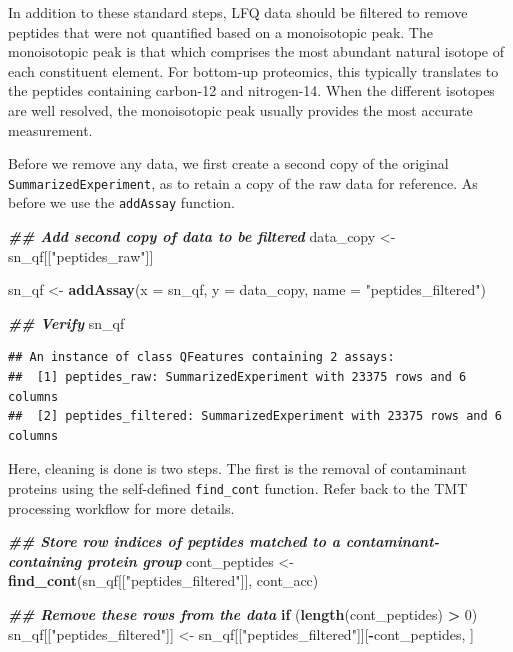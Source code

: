 \documentclass[9pt,a4paper,]{extarticle}
\newenvironment{Shaded}{\begin{snugshade}}{\end{snugshade}}
\newcommand{\AttributeTok}[1]{\textcolor[rgb]{0.13,0.29,0.53}{#1}}
\newcommand{\ControlFlowTok}[1]{\textcolor[rgb]{0.13,0.29,0.53}{\textbf{#1}}}
\newcommand{\DecValTok}[1]{\textcolor[rgb]{0.00,0.00,0.81}{#1}}
\newcommand{\DocumentationTok}[1]{\textcolor[rgb]{0.56,0.35,0.01}{\textbf{\textit{#1}}}}
\newcommand{\FunctionTok}[1]{\textcolor[rgb]{0.13,0.29,0.53}{\textbf{#1}}}
\newcommand{\NormalTok}[1]{#1}
\newcommand{\OtherTok}[1]{\textcolor[rgb]{0.56,0.35,0.01}{#1}}
\newcommand{\SpecialCharTok}[1]{\textcolor[rgb]{0.81,0.36,0.00}{\textbf{#1}}}
\newcommand{\StringTok}[1]{\textcolor[rgb]{0.31,0.60,0.02}{#1}}
\begin{document}
In addition to these standard steps, LFQ data should be filtered to remove
peptides that were not quantified based on a monoisotopic peak. The monoisotopic
peak is that which comprises the most abundant natural isotope of each
constituent element. For bottom-up proteomics, this typically translates to the
peptides containing carbon-12 and nitrogen-14. When the different isotopes are
well resolved, the monoisotopic peak usually provides the most accurate
measurement.

Before we remove any data, we first create a second copy of the original
\texttt{SummarizedExperiment}, as to retain a copy of the raw data for reference. As
before we use the \texttt{addAssay} function.

\begin{Shaded}
\begin{Highlighting}[]
\DocumentationTok{\#\# Add second copy of data to be filtered}
\NormalTok{data\_copy }\OtherTok{\textless{}{-}}\NormalTok{ sn\_qf[[}\StringTok{"peptides\_raw"}\NormalTok{]]}

\NormalTok{sn\_qf }\OtherTok{\textless{}{-}} \FunctionTok{addAssay}\NormalTok{(}\AttributeTok{x =}\NormalTok{ sn\_qf,}
                  \AttributeTok{y =}\NormalTok{ data\_copy, }
                  \AttributeTok{name =} \StringTok{"peptides\_filtered"}\NormalTok{)}

\DocumentationTok{\#\# Verify}
\NormalTok{sn\_qf}
\end{Highlighting}
\end{Shaded}

\begin{verbatim}
## An instance of class QFeatures containing 2 assays:
##  [1] peptides_raw: SummarizedExperiment with 23375 rows and 6 columns 
##  [2] peptides_filtered: SummarizedExperiment with 23375 rows and 6 columns
\end{verbatim}

Here, cleaning is done is two steps. The first is the removal of contaminant
proteins using the self-defined \texttt{find\_cont} function. Refer back to the TMT
processing workflow for more details.

\begin{Shaded}
\begin{Highlighting}[]
\DocumentationTok{\#\# Store row indices of peptides matched to a contaminant{-}containing protein group}
\NormalTok{cont\_peptides }\OtherTok{\textless{}{-}} \FunctionTok{find\_cont}\NormalTok{(sn\_qf[[}\StringTok{"peptides\_filtered"}\NormalTok{]], cont\_acc)}

\DocumentationTok{\#\# Remove these rows from the data}
\ControlFlowTok{if}\NormalTok{ (}\FunctionTok{length}\NormalTok{(cont\_peptides) }\SpecialCharTok{\textgreater{}} \DecValTok{0}\NormalTok{)}
\NormalTok{  sn\_qf[[}\StringTok{"peptides\_filtered"}\NormalTok{]] }\OtherTok{\textless{}{-}}\NormalTok{ sn\_qf[[}\StringTok{"peptides\_filtered"}\NormalTok{]][}\SpecialCharTok{{-}}\NormalTok{cont\_peptides, ]}
\end{Highlighting}
\end{Shaded}
\end{document}
